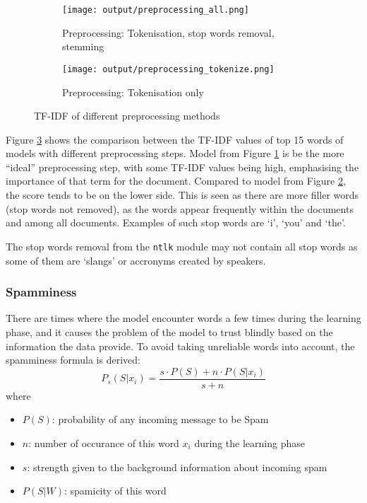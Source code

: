 \begin{figure}[h]
    \centering
    \begin{subfigure}[b]{0.45\textwidth}
        \texttt{[image: output/preprocessing\_all.png]}
        \caption{Preprocessing: Tokenisation, stop words removal, stemming}
        \label{fig:preprocessing_all}
    \end{subfigure}
    \hfill
    \begin{subfigure}[b]{0.45\textwidth}
        \texttt{[image: output/preprocessing\_tokenize.png]}
        \caption{Preprocessing: Tokenisation only}
        \label{fig:preprocessing_tokenize}
    \end{subfigure}
    \caption{TF-IDF of different preprocessing methods}
    \label{fig:preprocessing}
\end{figure}

Figure \ref{fig:preprocessing} shows the comparison between the TF-IDF values of top 15 words of models with different preprocessing steps. 
Model from Figure \ref{fig:preprocessing_all} is be the more ``ideal'' preprocessing step, with some TF-IDF values being high, emphasising the importance of that term for the document.
Compared to model from Figure \ref{fig:preprocessing_tokenize}, the score tends to be on the lower side. This is seen as there are more filler words (stop words not removed), as the words appear frequently within the documents and among all documents.
Examples of such stop words are `i', `you' and `the'.

The stop words removal from the \texttt{ntlk} module may not contain all stop words as some of them are `slangs' or accronyms created by speakers. 


\subsubsection{Spamminess}

There are times where the model encounter words a few times during the learning phase, and it causes the problem of the model to trust blindly based on the information the data provide. 
To avoid taking unreliable words into account, the spamminess formula is derived:
\begin{equation}
    P_s(S | x_i) = \frac{s \cdot P(S) + n \cdot P(S | x_i)}{s + n}
\end{equation}
where
\begin{itemize}
    \item $P(S)$: probability of any incoming message to be Spam
    \item $n$: number of occurance of this word $x_i$ during the learning phase
    \item $s$: strength given to the background information about incoming spam
    \item $P(S | W)$: spamicity of this word
\end{itemize}


